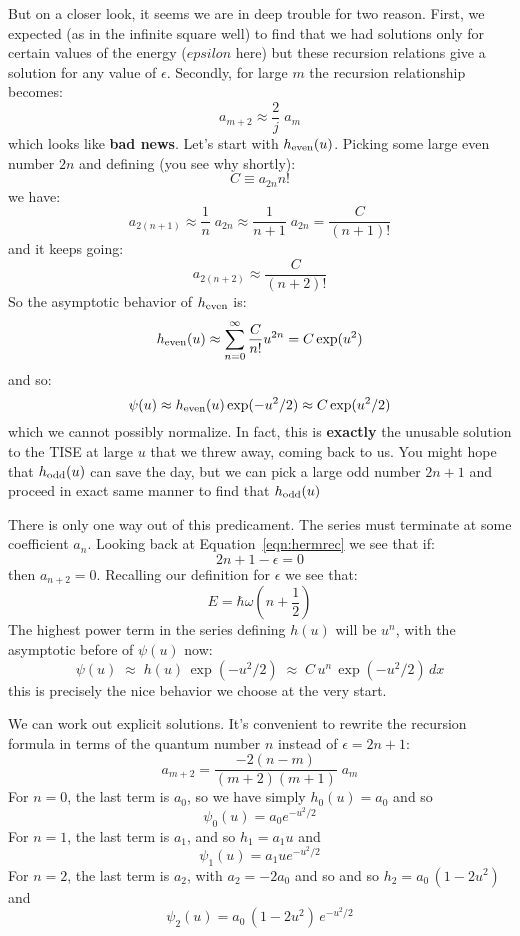 \documentclass[12pt]{book}
\begin{document}
But on a closer look, it seems we are in deep trouble for two reason.  First, we expected (as in the infinite square well) to find that we had solutions only for certain values of the energy ($epsilon$ here) but these recursion relations give a solution for any value of $\epsilon$.  Secondly, for large $m$ the recursion relationship becomes:
$$a_{m+2} \approx \frac{2}{j}\;a_{m}$$
which looks like {\bf bad news}.  Let's start with $h_{\rm even}(u)$.  Picking some large even number $2n$ and defining (you see why shortly):
$$C \equiv a_{2n} n!$$
we have:
$$a_{2(n+1)} \approx \frac{1}{n}\;a_{2n} \approx \frac{1}{n+1}\;a_{2n} = \frac{C}{(n+1)!}$$
and it keeps going:
$$a_{2(n+2)} \approx \frac{C}{(n+2)!}$$
So the asymptotic behavior of $h_{\rm even}$ is:
$$h_{\rm even}(u) \approx \sum_{n=0}^{\infty} \frac{C}{n!}u^{2n} = C\exp(u^2)$$
and so:
$$\psi(u) \approx h_{\rm even}(u) \exp(-u^2/2) \approx C \exp(u^2/2)$$
which we cannot possibly normalize.  In fact, this is {\bf exactly} the unusable solution to the TISE at large $u$ that we threw away, coming back to us.
You might hope that $h_{\rm odd}(u)$ can save the day, but we can pick a large odd number $2n+1$ and proceed in exact same manner to find that $h_{\rm odd}(u)$

There is only one way out of this predicament.  The series must terminate at some coefficient $a_n$.
Looking back at Equation~\ref{eqn:hermrec} we see that if:
$$2n+1-\epsilon = 0$$
then $a_{n+2} = 0$.  Recalling our definition for $\epsilon$ we see that:
\begin{equation}
E = \hbar \omega \left( n + \frac{1}{2} \right)
\end{equation}
The highest power term in the series defining $h(u)$ will be $u^n$, with the asymptotic before of $\psi(u)$ now:
$$\psi(u) \; \approx \; h(u) \, \exp(-u^2/2) \; \approx \; C \, u^n \, \exp(-u^2/2) \, dx $$
this is precisely the nice behavior we choose at the very start.

We can work out explicit solutions.  It's convenient to rewrite the recursion formula in terms of the quantum number $n$ instead of $\epsilon = 2n+1$:
\begin{equation}
a_{m+2} = \frac{-2(n-m)}{(m+2)(m+1)} \; a_m
\end{equation}
For $n=0$, the last term is $a_0$, so we have simply
$h_0(u) = a_0$ and so
$$\psi_0(u) = a_0 e^{-u^2/2}$$
For $n=1$, the last term is $a_1$, and so $h_1=a_1 u$ and
$$\psi_1(u) = a_1 u e^{-u^2/2} $$
For $n=2$, the last term is $a_2$, with $a_2 = -2a_0$ and so
and so $h_2=a_0 \, (1-2u^2)$ and
$$\psi_2(u) =  a_0 \, (1-2u^2) \, e^{-u^2/2} $$
\end{document}
